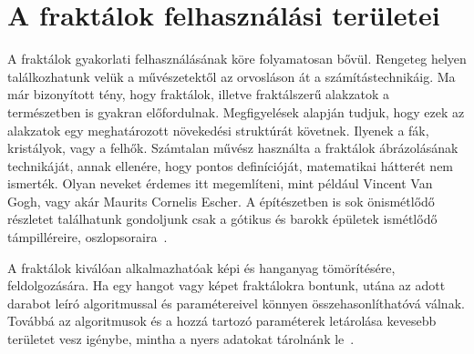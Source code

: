 \section{A fraktálok felhasználási területei}
A fraktálok gyakorlati felhasználásának köre folyamatosan bővül. Rengeteg helyen találkozhatunk velük a művészetektől az orvosláson át a számítástechnikáig. Ma már bizonyított tény, hogy fraktálok, illetve fraktálszerű alakzatok a természetben is gyakran előfordulnak. Megfigyelések alapján tudjuk, hogy ezek az alakzatok egy meghatározott növekedési struktúrát követnek. Ilyenek a fák, kristályok, vagy a felhők. Számtalan művész használta a fraktálok ábrázolásának technikáját, annak ellenére, hogy pontos definícióját, matematikai hátterét nem ismerték.
Olyan neveket érdemes itt megemlíteni, mint például Vincent Van Gogh, vagy akár Maurits Cornelis Escher. A építészetben is sok önismétlődő részletet találhatunk gondoljunk csak a gótikus és barokk épületek ismétlődő támpilléreire, oszlopsoraira~\cite{alkalmazas}.
\par A fraktálok kiválóan alkalmazhatóak képi és hanganyag tömörítésére, feldolgozására. Ha egy hangot vagy képet fraktálokra bontunk, utána az adott darabot leíró algoritmussal és paramétereivel könnyen összehasonlíthatóvá válnak. Továbbá az algoritmusok és a hozzá tartozó paraméterek letárolása kevesebb területet vesz igénybe, mintha a nyers adatokat tárolnánk le~\cite{alkalmazas}.